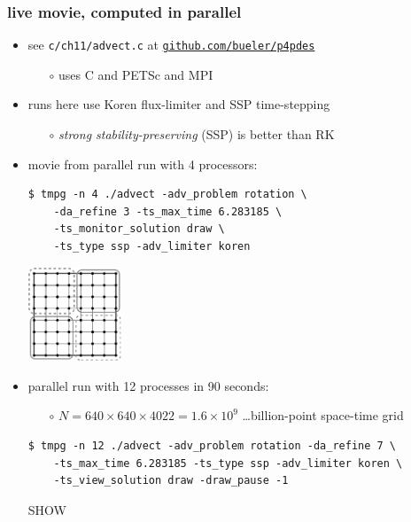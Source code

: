 \documentclass[10pt,dvipsnames,usepdftitle=false,
hyperref={pdftitle = {Finite volume methods},
    pdfauthor = {Ed Bueler}}]{beamer}
\begin{document}
\begin{frame}[fragile]
\frametitle{live movie, computed in parallel}

\begin{itemize}
\item see \texttt{c/ch11/advect.c} at \href{https://github.com/bueler/p4pdes}{\texttt{github.com/bueler/p4pdes}}
    \begin{itemize}
    \item[$\circ$] uses C and PETSc and MPI
    \end{itemize}
\item runs here use Koren flux-limiter and SSP time-stepping
    \begin{itemize}
    \item[$\circ$] \emph{strong stability-preserving} (SSP) is better than RK
    \end{itemize}
\item movie from parallel run with 4 processors:
\begin{Verbatim}[fontsize=\footnotesize]
$ tmpg -n 4 ./advect -adv_problem rotation \
    -da_refine 3 -ts_max_time 6.283185 \
    -ts_monitor_solution draw \
    -ts_type ssp -adv_limiter koren
\end{Verbatim}

\vspace{-20mm}
\hfill \includegraphics[width=0.22\textwidth]{figs/buelerfourproc}

\vspace{-1mm}
\item parallel run with 12 processes in 90 seconds:
    \begin{itemize}
    \item[$\circ$] $N=640\times 640 \times 4022 = 1.6 \times 10^9$ \dots billion-point space-time grid
    \end{itemize}
\begin{Verbatim}[fontsize=\footnotesize]
$ tmpg -n 12 ./advect -adv_problem rotation -da_refine 7 \
    -ts_max_time 6.283185 -ts_type ssp -adv_limiter koren \
    -ts_view_solution draw -draw_pause -1
\end{Verbatim}

\bigskip
\hspace{15mm} \alert{SHOW}
\end{itemize}
\end{frame}
\end{document}
